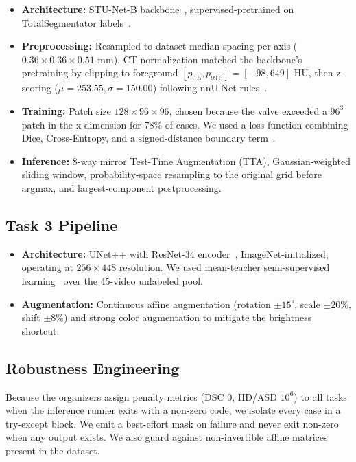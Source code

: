 \documentclass[runningheads]{llncs}
\begin{document}
\begin{itemize}
    \item \textbf{Architecture:} STU-Net-B backbone~\cite{huang2023stunet}, supervised-pretrained on TotalSegmentator labels~\cite{totalseg}.
    \item \textbf{Preprocessing:} Resampled to dataset median spacing per axis ($0.36 \times 0.36 \times 0.51$ mm). CT normalization matched the backbone's pretraining by clipping to foreground $[p_{0.5}, p_{99.5}] = [-98, 649]$ HU, then z-scoring ($\mu = 253.55, \sigma = 150.00$) following nnU-Net rules~\cite{isensee2021nnunet}.
    \item \textbf{Training:} Patch size $128 \times 96 \times 96$, chosen because the valve exceeded a $96^3$ patch in the x-dimension for 78\% of cases. We used a loss function combining Dice, Cross-Entropy, and a signed-distance boundary term~\cite{kervadec2019boundary}.
    \item \textbf{Inference:} 8-way mirror Test-Time Augmentation (TTA), Gaussian-weighted sliding window, probability-space resampling to the original grid before argmax, and largest-component postprocessing.
\end{itemize}

\subsection{Task 3 Pipeline}

\begin{itemize}
    \item \textbf{Architecture:} UNet++ with ResNet-34 encoder~\cite{zhou2019unet,he2016resnet}, ImageNet-initialized, operating at $256 \times 448$ resolution. We used mean-teacher semi-supervised learning~\cite{tarvainen2017mean} over the 45-video unlabeled pool.
    \item \textbf{Augmentation:} Continuous affine augmentation (rotation $\pm 15^\circ$, scale $\pm 20\%$, shift $\pm 8\%$) and strong color augmentation to mitigate the brightness shortcut.
\end{itemize}

\subsection{Robustness Engineering}

Because the organizers assign penalty metrics (DSC 0, HD/ASD $10^6$) to all tasks when the inference runner exits with a non-zero code, we isolate every case in a try-except block. We emit a best-effort mask on failure and never exit non-zero when any output exists. We also guard against non-invertible affine matrices present in the dataset.
\end{document}
